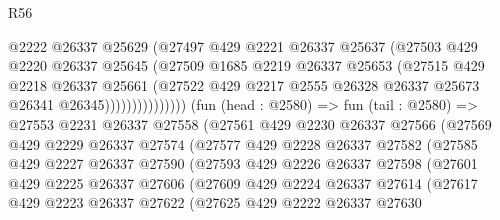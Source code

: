 \begin{lexlean}{R56}
\begin{coremodule}
                            @2222
                            @26337
                            @25629
                            (@27497
                              @429
                              @2221
                              @26337
                              @25637
                              (@27503
                                @429
                                @2220
                                @26337
                                @25645
                                (@27509
                                  @1685
                                  @2219
                                  @26337
                                  @25653
                                  (@27515
                                    @429
                                    @2218
                                    @26337
                                    @25661
                                    (@27522
                                      @429
                                      @2217
                                      @2555
                                      @26328
                                      @26337
                                      @25673
                                      @26341
                                      @26345)))))))))))))))
        (fun (head : @2580) =>
        fun (tail : @2580) =>
        @27553
          @2231
          @26337
          @27558
          (@27561
            @429
            @2230
            @26337
            @27566
            (@27569
              @429
              @2229
              @26337
              @27574
              (@27577
                @429
                @2228
                @26337
                @27582
                (@27585
                  @429
                  @2227
                  @26337
                  @27590
                  (@27593
                    @429
                    @2226
                    @26337
                    @27598
                    (@27601
                      @429
                      @2225
                      @26337
                      @27606
                      (@27609
                        @429
                        @2224
                        @26337
                        @27614
                        (@27617
                          @429
                          @2223
                          @26337
                          @27622
                          (@27625
                            @429
                            @2222
                            @26337
                            @27630

\end{coremodule}
\end{lexlean}
